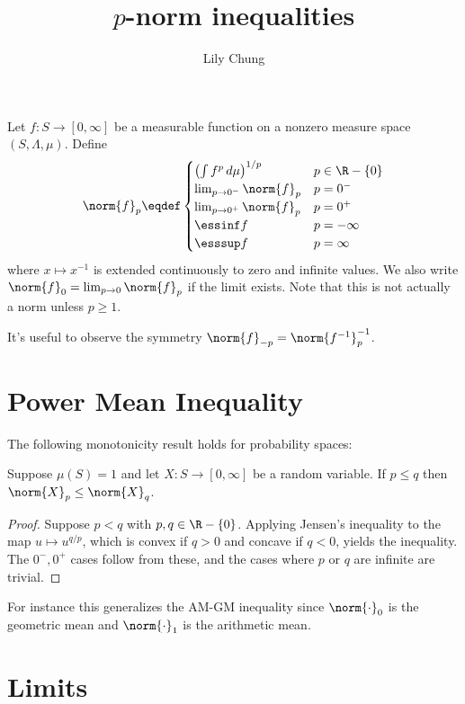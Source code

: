 \documentclass{article}
\title{$p$-norm inequalities}
\author{Lily Chung}
\date{}
\begin{document}
\maketitle

Let $f : S \to [0, \infty]$ be a measurable function on a nonzero measure space $(S, \Lambda, \mu)$.
Define \[\norm{f}_p \eqdef \begin{cases}
  \left(\int f^p\,d\mu\right)^{1/p} & p \in \R - \{0\} \\
  \lim_{p \to 0^-} \norm{f}_p & p = 0^- \\
  \lim_{p \to 0^+} \norm{f}_p & p = 0^+ \\
  \essinf f & p = -\infty \\
  \esssup f & p = \infty \\
  \end{cases}
\]
where $x \mapsto x^{-1}$ is extended continuously to zero and infinite values.
We also write $\norm{f}_0 = \lim_{p \to 0} \norm{f}_p$ if the limit exists.
Note that this is not actually a norm unless $p \ge 1$.

It's useful to observe the symmetry $\norm{f}_{-p} = \norm{f^{-1}}_p^{-1}$.

\section*{Power Mean Inequality}

The following monotonicity result holds for probability spaces:

\begin{theorem}\label{thm:power mean}
  Suppose $\mu(S) = 1$ and let $X : S \to [0, \infty]$ be a random variable.
  If $p \le q$ then $\norm{X}_p \le \norm{X}_q$.
\end{theorem}
\begin{proof}
  Suppose $p < q$ with $p, q \in \R - \{0\}$.
  Applying Jensen's inequality to the map $u \mapsto u^{q/p}$,
  which is convex if $q > 0$ and concave if $q < 0$,
  yields the inequality.
  The $0^-, 0^+$ cases follow from these,
  and the cases where $p$ or $q$ are infinite are trivial.
\end{proof}

For instance this generalizes the AM-GM inequality since $\norm{\cdot}_0$ is the geometric mean and $\norm{\cdot}_1$ is the arithmetic mean.

\section*{Limits}
\end{document}
